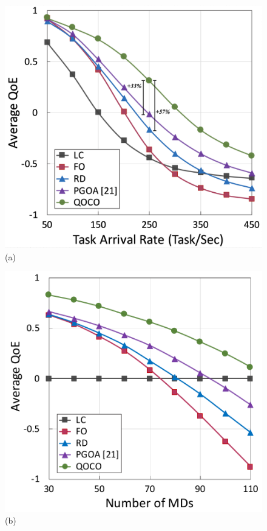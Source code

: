 \begin{frame}
	\begin{figure}
		\begin{minipage}[b]{0.47\linewidth}
			\centering
			\includegraphics[width=\textwidth]{444_} 
			\hspace{0.6cm}(a)
		\end{minipage}
		\hspace{-0.2cm}
		\begin{minipage}[b]{0.47\linewidth}
			\centering
			\includegraphics[width=\textwidth]{445}
			\hspace{0.6cm}(b)
		\end{minipage}
		

\end{figure}
\end{frame}
